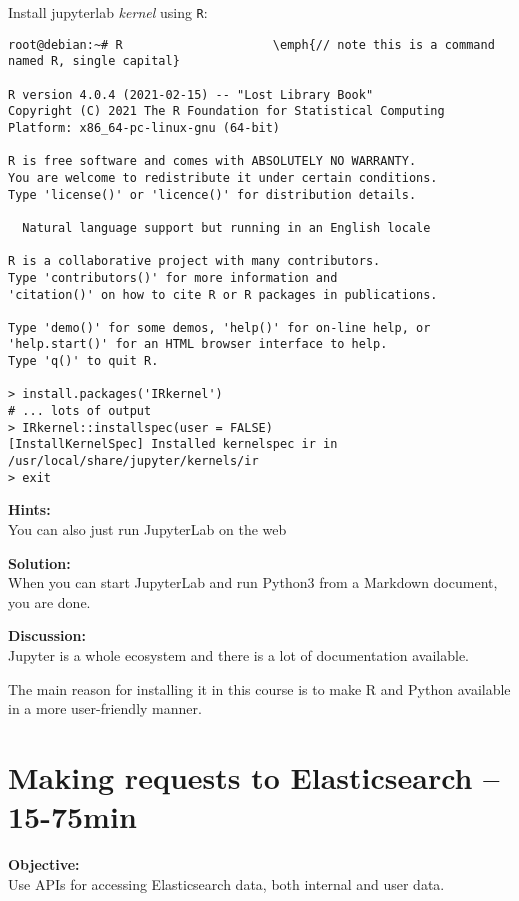 \documentclass[a4paper,11pt,notitlepage]{report}
\begin{document}
Install jupyterlab \emph{kernel} using \verb+R+:
\begin{verbatim}
root@debian:~# R                     \emph{// note this is a command named R, single capital}

R version 4.0.4 (2021-02-15) -- "Lost Library Book"
Copyright (C) 2021 The R Foundation for Statistical Computing
Platform: x86_64-pc-linux-gnu (64-bit)

R is free software and comes with ABSOLUTELY NO WARRANTY.
You are welcome to redistribute it under certain conditions.
Type 'license()' or 'licence()' for distribution details.

  Natural language support but running in an English locale

R is a collaborative project with many contributors.
Type 'contributors()' for more information and
'citation()' on how to cite R or R packages in publications.

Type 'demo()' for some demos, 'help()' for on-line help, or
'help.start()' for an HTML browser interface to help.
Type 'q()' to quit R.

> install.packages('IRkernel')
# ... lots of output
> IRkernel::installspec(user = FALSE)
[InstallKernelSpec] Installed kernelspec ir in /usr/local/share/jupyter/kernels/ir
> exit
\end{verbatim}



{\bf Hints:}\\
You can also just run JupyterLab on the web \smiley

{\bf Solution:}\\
When you can start JupyterLab and run Python3 from a Markdown document, you are done.


{\bf Discussion:}\\
Jupyter is a whole ecosystem and there is a lot of documentation available.

The main reason for installing it in this course is to make R and Python available in a more user-friendly manner.



\chapter{Making requests to Elasticsearch -- 15-75min}
\label{ex:es-rest-api}


{\bf Objective:}\\
Use APIs for accessing Elasticsearch data, both internal and user data.
\end{document}
